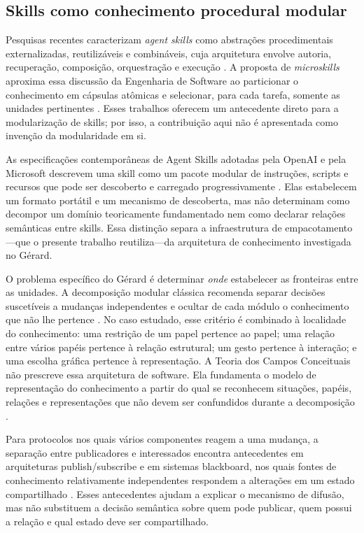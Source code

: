 \documentclass[preprint,12pt,authoryear]{elsarticle}
\newcommand{\gerard}{Gérard\xspace}
\begin{document}
\subsection{Skills como conhecimento procedural modular}

Pesquisas recentes caracterizam \emph{agent skills} como abstrações procedimentais externalizadas, reutilizáveis e combináveis, cuja arquitetura envolve autoria, recuperação, composição, orquestração e execução \citep{badhe2026survey}. A proposta de \emph{microskills} aproxima essa discussão da Engenharia de Software ao particionar o conhecimento em cápsulas atômicas e selecionar, para cada tarefa, somente as unidades pertinentes \citep{zare2026microskill}. Esses trabalhos oferecem um antecedente direto para a modularização de skills; por isso, a contribuição aqui não é apresentada como invenção da modularidade em si.

As especificações contemporâneas de Agent Skills adotadas pela OpenAI e pela Microsoft descrevem uma skill como um pacote modular de instruções, scripts e recursos que pode ser descoberto e carregado progressivamente \citep{openai2026skills,microsoft2026skills}. Elas estabelecem um formato portátil e um mecanismo de descoberta, mas não determinam como decompor um domínio teoricamente fundamentado nem como declarar relações semânticas entre skills. Essa distinção separa a infraestrutura de empacotamento---que o presente trabalho reutiliza---da arquitetura de conhecimento investigada no \gerard.

O problema específico do \gerard é determinar \emph{onde} estabelecer as fronteiras entre as unidades. A decomposição modular clássica recomenda separar decisões suscetíveis a mudanças independentes e ocultar de cada módulo o conhecimento que não lhe pertence \citep{parnas1972criteria}. No caso estudado, esse critério é combinado à localidade do conhecimento: uma restrição de um papel pertence ao papel; uma relação entre vários papéis pertence à relação estrutural; um gesto pertence à interação; e uma escolha gráfica pertence à representação. A Teoria dos Campos Conceituais não prescreve essa arquitetura de software. Ela fundamenta o modelo de representação do conhecimento a partir do qual se reconhecem situações, papéis, relações e representações que não devem ser confundidos durante a decomposição \citep{vergnaud1998representation}.

Para protocolos nos quais vários componentes reagem a uma mudança, a separação entre publicadores e interessados encontra antecedentes em arquiteturas publish/subscribe \citep{eugster2003many} e em sistemas blackboard, nos quais fontes de conhecimento relativamente independentes respondem a alterações em um estado compartilhado \citep{nii1986blackboard}. Esses antecedentes ajudam a explicar o mecanismo de difusão, mas não substituem a decisão semântica sobre quem pode publicar, quem possui a relação e qual estado deve ser compartilhado.
\end{document}
